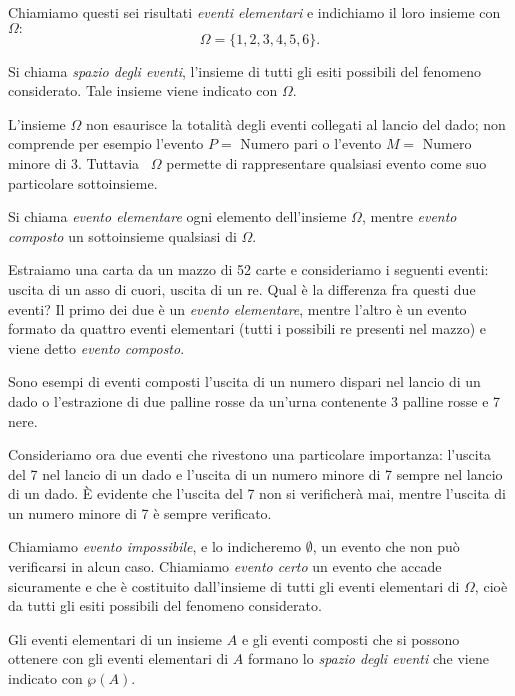 Chiamiamo questi sei risultati \emph{eventi elementari} e indichiamo il loro insieme con 
$\Omega:$ 
\[\Omega =\{1,2,3,4,5,6\}.\]

\begin{definizione}
Si chiama \emph{spazio degli eventi}, l’insieme di tutti gli esiti possibili del fenomeno considerato. Tale insieme viene indicato con $\Omega $.
\end{definizione}

L'insieme $\Omega $ non esaurisce la totalità degli eventi collegati al lancio del dado; non comprende per esempio l'evento $P=$ Numero pari o l'evento $M=$ Numero minore di $3$. Tuttavia~ $\Omega $ permette di rappresentare qualsiasi evento come suo particolare sottoinsieme.

\begin{definizione}
Si chiama \emph{evento elementare} ogni elemento dell’insieme $\Omega$, mentre \emph{evento composto} un sottoinsieme qualsiasi di $\Omega$.
\end{definizione}

Estraiamo una carta da un mazzo di 52 carte e consideriamo i seguenti eventi: uscita di un asso di cuori, uscita di un re. Qual è la differenza fra questi due eventi? Il primo dei due è un \emph{evento elementare}, mentre l’altro è un evento formato da quattro eventi elementari (tutti i possibili re presenti nel mazzo) e viene detto \emph{evento composto}.

Sono esempi di eventi composti l’uscita di un numero dispari nel lancio di un dado o l’estrazione di due palline rosse da un’urna contenente 3 palline rosse e 7 nere.

Consideriamo ora due eventi che rivestono una particolare importanza: l’uscita del 7 nel lancio di un dado e l’uscita di un numero minore di 7 sempre nel lancio di un dado. È evidente che l'uscita del 7 non si verificherà mai, mentre l'uscita di un numero minore di 7 è sempre verificato.

\begin{definizione}
Chiamiamo \emph{evento impossibile}, e lo indicheremo $\emptyset $, un evento che non può verificarsi in alcun caso.
Chiamiamo \emph{evento certo} un evento che accade sicuramente e che è costituito dall'insieme di tutti gli eventi elementari di $\Omega $, cioè da tutti gli esiti possibili del fenomeno considerato.
\end{definizione}

Gli eventi elementari di un insieme $A$ e gli eventi composti che si possono ottenere con gli eventi elementari di $A$ formano lo \emph{spazio degli eventi} che viene indicato con $\wp (A)$.

